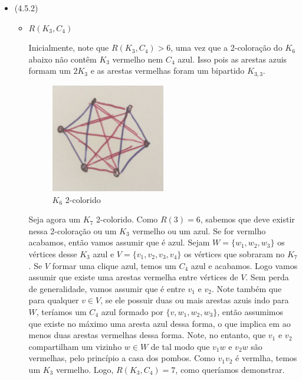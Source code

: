 \documentclass{article}
\begin{document}
\begin{itemize}
\begin{itemize}
		\end{itemize}

	\item (4.5.2)

		\begin{itemize}
			\item \(R(K_3, C_4)\)

				Inicialmente, note que \(R(K_3, C_4) > 6\), uma vez que a 2-coloração do \(K_6\) abaixo não contêm \(K_3\) vermelho nem
				\(C_4\) azul. Isso pois as arestas azuis formam um \(2 K_3\) e as arestas vermelhas foram um bipartido \(K_{3, 3}\).

 
			                  \begin{figure}[H]
				                  \centering
				                  \includegraphics[width=0.5\textwidth]{images/k6.jpeg}
								  \caption{\(K_6\) 2-colorido}
			                  \end{figure}

				Seja agora um \(K_7\) 2-colorido. Como \(R(3) = 6\), sabemos que deve existir nessa 2-coloração ou um \(K_3\) vermelho ou um azul. Se for vermlho acabamos,
				então vamos assumir que é azul. Sejam \(W = \{w_1, w_2, w_3\}\) os vértices desse \(K_3\) azul e \( V = \{v_1, v_2, v_3, v_4\}\) os vértices que sobraram no \(K_7\). Se \(V\) formar
				uma clique azul, temos um \(C_4\) azul e acabamos. Logo vamos assumir que existe uma arestas vermelha entre vértices de \(V\). Sem perda de generalidade, vamos assumir
				que é entre \(v_1\) e \(v_2\). Note também que para qualquer \(v \in V\), se ele possuir duas ou mais arestas azuis indo para \(W\), teríamos um \(C_4\)
				azul formado por \(\{v, w_1, w_2, w_3\}\), então assumimos que existe no máximo uma aresta azul dessa forma, o que implica em ao menos duas arestas vermelhas
				dessa forma. Note, no entanto, que \(v_1\) e \(v_2\) compartilham um vizinho \(w \in W\) de tal modo que \(v_1w\) e \(v_2w\) são vermelhas,
				pelo princípio a casa dos pombos. Como \(v_1v_2\) é vermlha, temos um \(K_3\) vermelho. Logo, \(R(K_3, C_4) = 7\), como queríamos demonstrar.


\end{itemize}
\end{itemize}
\end{document}
